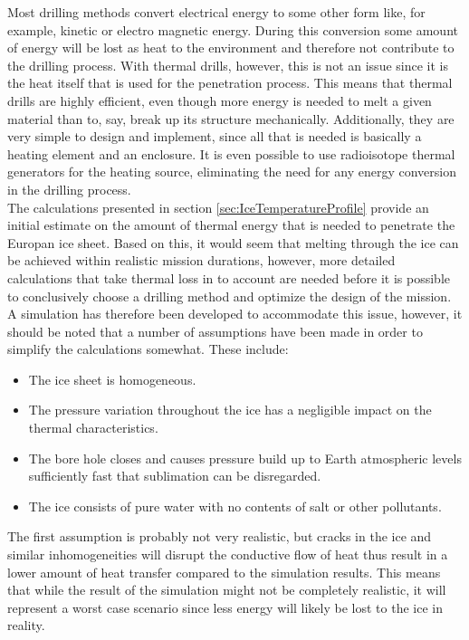 \label{sec:temp_simulation}
Most drilling methods convert electrical energy to some other form like, for example, kinetic or electro magnetic energy. During this conversion some amount of energy will be lost as heat to the environment and therefore not contribute to the drilling process. With thermal drills, however, this is not an issue since it is the heat itself that is used for the penetration process. This means that thermal drills are highly efficient, even though more energy is needed to melt a given material than to, say, break up its structure mechanically. Additionally, they are very simple to design and implement, since all that is needed is basically a heating element and an enclosure. It is even possible to use radioisotope thermal generators for the heating source, eliminating the need for any energy conversion in the drilling process.\\

\noindent
The calculations presented in section \ref{sec:IceTemperatureProfile} provide an initial estimate on the amount of thermal energy that is needed to penetrate the Europan ice sheet. Based on this, it would seem that melting through the ice can be achieved within realistic mission durations, however, more detailed calculations that take thermal loss in to account are needed before it is possible to conclusively choose a drilling method and optimize the design of the mission. \\

\noindent
A simulation has therefore been developed to accommodate this issue, however, it should be noted that a number of assumptions have been made in order to simplify the calculations somewhat. These include:
\begin{itemize}
	\item The ice sheet is homogeneous.
	\item The pressure variation throughout the ice has a negligible impact on the thermal characteristics.
	\item The bore hole closes and causes pressure build up to Earth atmospheric levels sufficiently fast that sublimation can be disregarded.
	\item The ice consists of pure water with no contents of salt or other pollutants.
\end{itemize}
The first assumption is probably not very realistic, but cracks in the ice and similar inhomogeneities will disrupt the conductive flow of heat thus result in a lower amount of heat transfer compared to the simulation results. This means that while the result of the simulation might not be completely realistic, it will represent a worst case scenario since less energy will likely be lost to the ice in reality. \\


